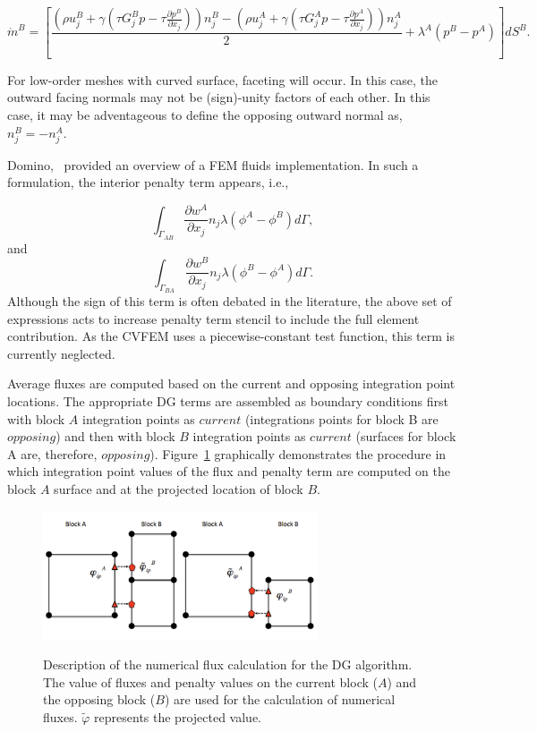 \begin{equation} 
        \dot {m}^B = [\frac{(\rho u_j^B + \gamma(\tau G_j^B p -\tau \frac{\partial p^B}{\partial x_j}))n_j^B
        				       - (\rho u_j^A + \gamma(\tau G_j^A p -\tau \frac{\partial p^A}{\partial x_j}))n_j^A}{2}
				       + \lambda^A ( p^B - p^A)] dS^B.
\label{mdotB}
\end{equation}

For low-order meshes with curved surface, faceting will occur. In this case, the outward facing normals may 
not be (sign)-unity factors of each other. In this case, it may be adventageous to define the opposing 
outward normal as, $n_j^B = -n_j^A$. 

Domino,~\cite{Domino:2010} provided an overview of a FEM fluids implementation. In such a formulation, the
interior penalty term appears, i.e.,

\begin{equation} 
   \int_{\Gamma_{AB}} \frac {\partial w^A}{\partial x_j} n_j \lambda (\phi^A-\phi^B) d\Gamma,
\end{equation}
and
\begin{equation} 
   \int_{\Gamma_{BA}} \frac {\partial w^B}{\partial x_j} n_j \lambda (\phi^B-\phi^A) d\Gamma.
\end{equation}
Although the sign of this term is often debated in the literature, the above set of expressions acts 
to increase penalty term stencil to include the full element contribution. 
As the CVFEM uses a piecewise-constant test function, this term is currently neglected.

Average fluxes are computed based on the current and opposing integration point locations. The 
appropriate DG terms are assembled as boundary conditions first with block $A$ integration 
points as $current$ (integrations points for block B are $opposing$) and then with block $B$ 
integration points as $current$ (surfaces for block A are, therefore, $opposing$). Figure~\ref{nonConformal} 
graphically demonstrates the procedure in which integration point values of the flux and penalty 
term are computed on the block $A$ surface and at the projected location of block $B$. 

\begin{figure}
\centering
  {\includegraphics[height=1.5in]{images/contactSearchAndEval.pdf}}
  \vspace{0.25in}
  \caption{Description of the numerical flux calculation for the DG algorithm. The 
    value of fluxes and penalty values on the current block ($A$) and the opposing block ($B$) are used 
    for the calculation of numerical fluxes. $\tilde \varphi$ represents the projected value.}
  \label{nonConformal}
\end{figure}

